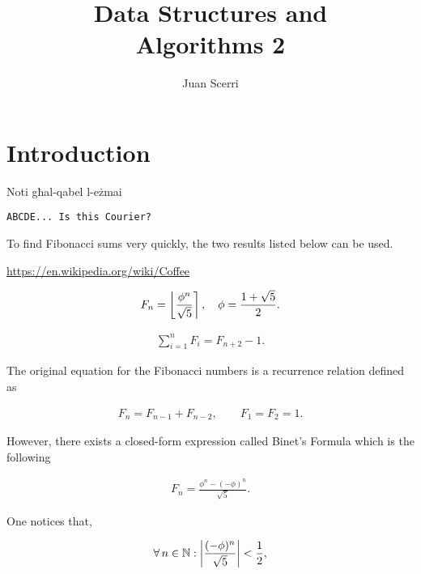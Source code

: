 \documentclass{uom-coursework}
\begin{document}
\title{Data Structures and\\Algorithms 2}
\author{Juan Scerri}
\courseworkdate{\monthyeardate\today}

\frontmatter
\maketitle

\tableofcontents*

\clearpage

\pagestyle{umpage}
\mainmatter
\chapter{Introduction}

Noti għal-qabel l-eżmai

\texttt{ABCDE... Is this Courier?}

To find Fibonacci sums very quickly, the two results listed
below can be used.



\url{https://en.wikipedia.org/wiki/Coffee}

\blinddocument

\begin{align}
  F_n = \left\lfloor \frac{\phi^n}{\sqrt{5}} \right\rceil, \quad \phi = \frac{1 +
  \sqrt{5}}{2}. \label{fib_num}
\end{align}

\begin{align}
  \sum_{i=1}^{n} F_i = F_{n+2} - 1. \label{fib_sum}
\end{align}


The original equation for the Fibonacci numbers is a recurrence
relation defined as

\begin{align}
  F_n = F_{n-1} + F_{n-2}, \qquad F_1 = F_2 = 1. \label{fib_def}
\end{align}

However, there exists a closed-form expression called Binet's
Formula which is the following

\begin{align*}
  F_n = \frac{\phi^n - (-\phi)^n}{\sqrt{5}}.
\end{align*}

One notices that,

\begin{align*}
  \forall \, n \in \mathbb{N} : \left\lvert \frac{(-\phi)^n}{\sqrt{5}} \right\rvert
  < \frac{1}{2},
\end{align*}
\end{document}
